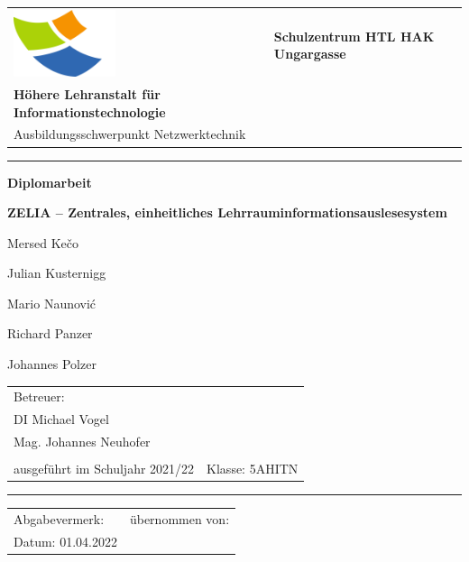 
\begin{titlepage}
    \begin{tabular}{p{2.5cm}p{}}
        \vspace{0mm}
        \includegraphics[width=3cm]{media/szu_logo.png} &
        \centering
        {\Large \textbf{Schulzentrum HTL HAK Ungargasse} \vspace{5mm}}\\
        \textbf{Höhere Lehranstalt für Informationstechnologie}\\ 
        Ausbildungsschwerpunkt Netzwerktechnik 
        \end{tabular}
        \vspace{5mm}
        \hrule
    \begin{center}
    \vspace{15mm}
    \begin{huge}
        \textbf{Diplomarbeit}
        \vspace{8mm}

        \begin{onehalfspace}
            \textbf{ZELIA -- Zentrales, einheitliches Lehrraum\-informations\-auslesesystem}
        \end{onehalfspace}
    \end{huge}
    \vspace{1cm}
    \begin{large}
        Mersed Kečo

        Julian Kusternigg
        
        Mario Naunović
        
        Richard Panzer
        
        Johannes Polzer

    \end{large}
\end{center}
\vfill
\begin{tabular}{p{}l}
    Betreuer: & \\
    
    {\large DI Michael Vogel} & \\
    {\large Mag. Johannes Neuhofer} & \\\\
    ausgeführt im Schuljahr 2021/22 & Klasse: 5AHITN \\

\end{tabular}
\vspace{1cm}
\hrule
    \begin{tabular}{p{}l}
        
        Abgabevermerk: &übernommen von:\\     
        
        Datum: 01.04.2022 & 
    \end{tabular}
\end{titlepage}